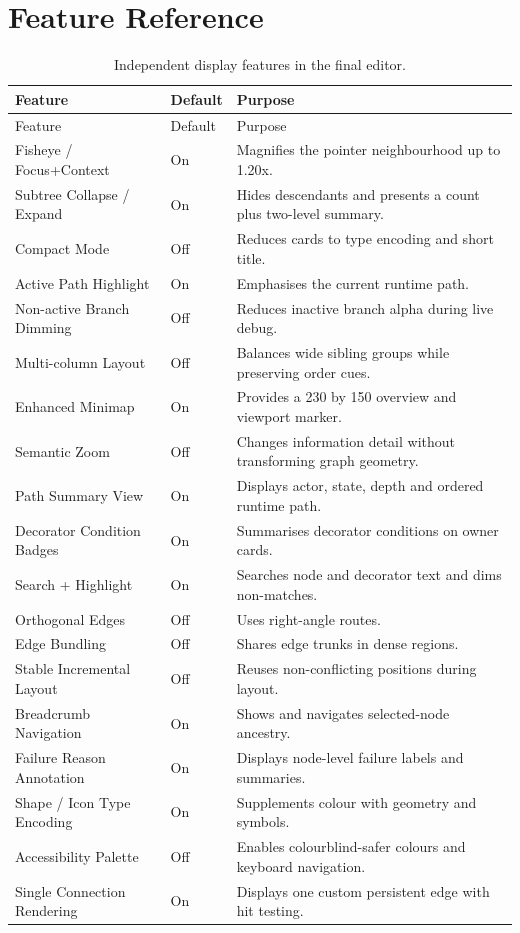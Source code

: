\chapter{Feature Reference}
\label{app:features}

\small
\begin{longtable}{p{}p{}p{}}
\caption{Independent display features in the final editor.}\\
\toprule Feature & Default & Purpose \\
\midrule\endfirsthead
\toprule Feature & Default & Purpose \\
\midrule\endhead
Fisheye / Focus+Context & On & Magnifies the pointer neighbourhood up to 1.20x. \\
Subtree Collapse / Expand & On & Hides descendants and presents a count plus two-level summary. \\
Compact Mode & Off & Reduces cards to type encoding and short title. \\
Active Path Highlight & On & Emphasises the current runtime path. \\
Non-active Branch Dimming & Off & Reduces inactive branch alpha during live debug. \\
Multi-column Layout & Off & Balances wide sibling groups while preserving order cues. \\
Enhanced Minimap & On & Provides a 230 by 150 overview and viewport marker. \\
Semantic Zoom & Off & Changes information detail without transforming graph geometry. \\
Path Summary View & On & Displays actor, state, depth and ordered runtime path. \\
Decorator Condition Badges & On & Summarises decorator conditions on owner cards. \\
Search + Highlight & On & Searches node and decorator text and dims non-matches. \\
Orthogonal Edges & Off & Uses right-angle routes. \\
Edge Bundling & Off & Shares edge trunks in dense regions. \\
Stable Incremental Layout & Off & Reuses non-conflicting positions during layout. \\
Breadcrumb Navigation & On & Shows and navigates selected-node ancestry. \\
Failure Reason Annotation & On & Displays node-level failure labels and summaries. \\
Shape / Icon Type Encoding & On & Supplements colour with geometry and symbols. \\
Accessibility Palette & Off & Enables colourblind-safer colours and keyboard navigation. \\
Single Connection Rendering & On & Displays one custom persistent edge with hit testing. \\
\bottomrule
\end{longtable}

